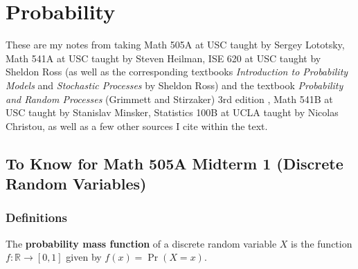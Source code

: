 %
%
%
%
%
%
%
%
%
%
%
%

\chapter{Probability}

These are my notes from taking Math 505A at USC taught by Sergey Lototsky, Math 541A at USC taught by Steven Heilman, ISE 620 at USC taught by Sheldon Ross (as well as the corresponding textbooks \textit{Introduction to Probability Models} \citep{2014i} and \textit{Stochastic Processes} \citep{ross2008stochastic} by Sheldon Ross) and the textbook \textit{Probability and Random Processes} (Grimmett and Stirzaker) 3rd edition \citep{grimmett2001probability}, Math 541B at USC taught by Stanislav Minsker, Statistics 100B at UCLA taught by Nicolas Christou, as well as a few other sources I cite within the text.

\section{To Know for Math 505A Midterm 1 (Discrete Random Variables)}

\subsection{Definitions}

\begin{definition}The \textbf{probability mass function} of a discrete random variable \(X\) is the function \(f: \mathbb{R} \to [0,1]\) given by \(f(x) = \Pr(X = x)\). \end{definition}

